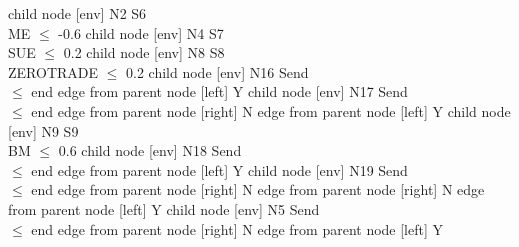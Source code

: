 
      child { node [env] {N2  S6 \\ ME $\leq$ -0.6} 
            child { node [env] {N4  S7 \\ SUE $\leq$ 0.2} 
                  child { node [env] {N8  S8 \\ ZEROTRADE $\leq$ 0.2} 
                        child { node [env] {N16  Send \\  $\leq$ end} 
                              edge from parent node [left] {Y} 
                        }
                        child { node [env] {N17  Send \\  $\leq$ end} 
                              edge from parent node [right] {N} 
                        }
                        edge from parent node [left] {Y} 
                  }
                  child { node [env] {N9  S9 \\ BM $\leq$ 0.6} 
                        child { node [env] {N18  Send \\  $\leq$ end} 
                              edge from parent node [left] {Y} 
                        }
                        child { node [env] {N19  Send \\  $\leq$ end} 
                              edge from parent node [right] {N} 
                        }
                        edge from parent node [right] {N} 
                  }
                  edge from parent node [left] {Y} 
            }
            child { node [env] {N5  Send \\  $\leq$ end} 
                  edge from parent node [right] {N} 
            }
            edge from parent node [left] {Y} 
      }
